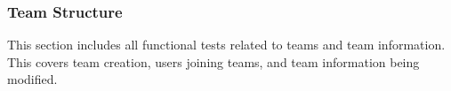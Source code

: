 \documentclass[12pt, titlepage]{article}
\begin{document}
\subsubsection{Team Structure}

This section includes all functional tests related to teams and team
information. This covers team creation, users joining teams, and team
information being modified.

\begin{enumerate}

















\end{enumerate}
\end{document}
